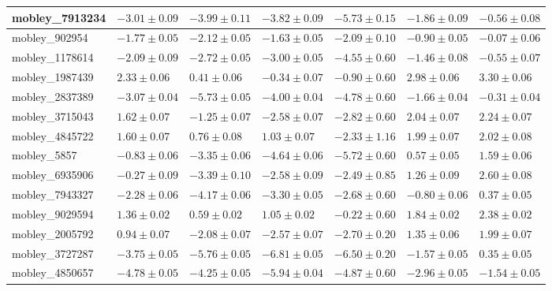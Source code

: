 \documentclass{article}
\begin{document}
\begin{landscape}
\begin{longtable}{|l{3.0cm}|l{3.0cm}|l{3.2cm}|l{3.6cm}|l{3.0cm}|l{3.0cm}|l{3.0cm}|}
mobley\_7913234	&	$	-3.01	\pm	0.09	$	&	$	-3.99	\pm	0.11	$	&	$	-3.82	\pm	0.09	$	&	$	-5.73	\pm	0.15	$	&	$	-1.86	\pm	0.09	$	&	$	-0.56	\pm	0.08	$	\\ \hline
mobley\_902954	&	$	-1.77	\pm	0.05	$	&	$	-2.12	\pm	0.05	$	&	$	-1.63	\pm	0.05	$	&	$	-2.09	\pm	0.10	$	&	$	-0.90	\pm	0.05	$	&	$	-0.07	\pm	0.06	$	\\ \hline
mobley\_1178614	&	$	-2.09	\pm	0.09	$	&	$	-2.72	\pm	0.05	$	&	$	-3.00	\pm	0.05	$	&	$	-4.55	\pm	0.60	$	&	$	-1.46	\pm	0.08	$	&	$	-0.55	\pm	0.07	$	\\ \hline
mobley\_1987439	&	$	2.33	\pm	0.06	$	&	$	0.41	\pm	0.06	$	&	$	-0.34	\pm	0.07	$	&	$	-0.90	\pm	0.60	$	&	$	2.98	\pm	0.06	$	&	$	3.30	\pm	0.06	$	\\ \hline
mobley\_2837389	&	$	-3.07	\pm	0.04	$	&	$	-5.73	\pm	0.05	$	&	$	-4.00	\pm	0.04	$	&	$	-4.78	\pm	0.60	$	&	$	-1.66	\pm	0.04	$	&	$	-0.31	\pm	0.04	$	\\ \hline
mobley\_3715043	&	$	1.62	\pm	0.07	$	&	$	-1.25	\pm	0.07	$	&	$	-2.58	\pm	0.07	$	&	$	-2.82	\pm	0.60	$	&	$	2.04	\pm	0.07	$	&	$	2.24	\pm	0.07	$	\\ \hline
mobley\_4845722	&	$	1.60	\pm	0.07	$	&	$	0.76	\pm	0.08	$	&	$	1.03	\pm	0.07	$	&	$	-2.33	\pm	1.16	$	&	$	1.99	\pm	0.07	$	&	$	2.02	\pm	0.08	$	\\ \hline
mobley\_5857	&	$	-0.83	\pm	0.06	$	&	$	-3.35	\pm	0.06	$	&	$	-4.64	\pm	0.06	$	&	$	-5.72	\pm	0.60	$	&	$	0.57	\pm	0.05	$	&	$	1.59	\pm	0.06	$	\\ \hline
mobley\_6935906	&	$	-0.27	\pm	0.09	$	&	$	-3.39	\pm	0.10	$	&	$	-2.58	\pm	0.09	$	&	$	-2.49	\pm	0.85	$	&	$	1.26	\pm	0.09	$	&	$	2.60	\pm	0.08	$	\\ \hline
mobley\_7943327	&	$	-2.28	\pm	0.06	$	&	$	-4.17	\pm	0.06	$	&	$	-3.30	\pm	0.05	$	&	$	-2.68	\pm	0.60	$	&	$	-0.80	\pm	0.06	$	&	$	0.37	\pm	0.05	$	\\ \hline
mobley\_9029594	&	$	1.36	\pm	0.02	$	&	$	0.59	\pm	0.02	$	&	$	1.05	\pm	0.02	$	&	$	-0.22	\pm	0.60	$	&	$	1.84	\pm	0.02	$	&	$	2.38	\pm	0.02	$	\\ \hline
mobley\_2005792	&	$	0.94	\pm	0.07	$	&	$	-2.08	\pm	0.07	$	&	$	-2.57	\pm	0.07	$	&	$	-2.70	\pm	0.20	$	&	$	1.35	\pm	0.06	$	&	$	1.99	\pm	0.07	$	\\ \hline
mobley\_3727287	&	$	-3.75	\pm	0.05	$	&	$	-5.76	\pm	0.05	$	&	$	-6.81	\pm	0.05	$	&	$	-6.50	\pm	0.20	$	&	$	-1.57	\pm	0.05	$	&	$	0.35	\pm	0.05	$	\\ \hline
mobley\_4850657	&	$	-4.78	\pm	0.05	$	&	$	-4.25	\pm	0.05	$	&	$	-5.94	\pm	0.04	$	&	$	-4.87	\pm	0.60	$	&	$	-2.96	\pm	0.05	$	&	$	-1.54	\pm	0.05	$	\\ \hline

\end{longtable}
\end{landscape}
\end{document}
